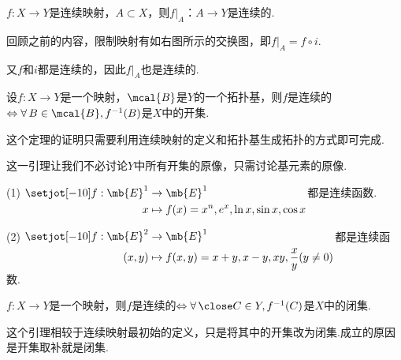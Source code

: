 \begin{instance}
    $f:X\to Y$是连续映射，$A\subset X$，则$f|_A：A\to Y$是连续的.\par
        \begin{figure}
        \vspace{-2.8 em}
        \vspace{-2 em}
    \end{figure}
    回顾之前的内容，限制映射有如右图所示的交换图，即$f|_A=f\circ i$.\par
    又$f$和$i$都是连续的，因此$f|_A$也是连续的.
\end{instance}

\begin{lemma}
    设$f:X\to Y$是一个映射，$\mcal{B}$是$Y$的一个拓扑基，则$f$是连续的$\Leftrightarrow \forall\, B\in\mcal{B},f^{-1}(B)$是$X$中的开集.
\end{lemma}
这个定理的证明只需要利用连续映射的定义和拓扑基生成拓扑的方式即可完成.\par
这一引理让我们不必讨论$Y$中所有开集的原像，只需讨论基元素的原像.\par

\begin{instance}
    (1)\; $\setjot[-10]\begin{aligned}[t]
        f: \mb{E}^1 &\to \mb{E}^1 \\
        x &\mapsto f(x)=x^n,e^x,\ln{x},\sin{x},\cos{x}
    \end{aligned}$都是连续函数.\par
    (2)\; $\setjot[-10]\begin{aligned}[t]
        f:\mb{E}^2 &\to \mb{E}^1 \\
        (x,y) &\mapsto f(x,y)=x+y,x-y,xy,\frac{x}{y}(y\neq 0)
    \end{aligned}$都是连续函数.
\end{instance}

\begin{lemma}
    $f:X\to Y$是一个映射，则$f$是连续的$\Leftrightarrow \forall\,\close C\in Y,f^{-1}(C)$是$X$中的闭集.
\end{lemma}
这个引理相较于连续映射最初始的定义，只是将其中的开集改为闭集.成立的原因是开集取补就是闭集.\par

